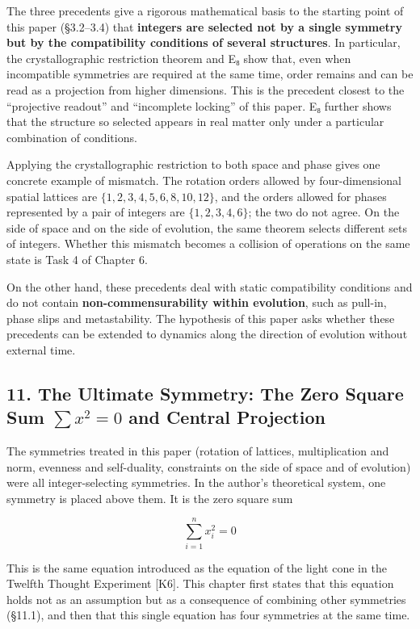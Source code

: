 \documentclass[
  a4paper,
]{article}
\begin{document}
The three precedents give a rigorous mathematical basis to the starting
point of this paper (§3.2--3.4) that \textbf{integers are selected not
by a single symmetry but by the compatibility conditions of several
structures}. In particular, the crystallographic restriction theorem and
E₈ show that, even when incompatible symmetries are required at the same
time, order remains and can be read as a projection from higher
dimensions. This is the precedent closest to the ``projective readout''
and ``incomplete locking'' of this paper. E₈ further shows that the
structure so selected appears in real matter only under a particular
combination of conditions.

Applying the crystallographic restriction to both space and phase gives
one concrete example of mismatch. The rotation orders allowed by
four-dimensional spatial lattices are \(\{1,2,3,4,5,6,8,10,12\}\), and
the orders allowed for phases represented by a pair of integers are
\(\{1,2,3,4,6\}\); the two do not agree. On the side of space and on the
side of evolution, the same theorem selects different sets of integers.
Whether this mismatch becomes a collision of operations on the same
state is Task 4 of Chapter 6.

On the other hand, these precedents deal with static compatibility
conditions and do not contain \textbf{non-commensurability within
evolution}, such as pull-in, phase slips and metastability. The
hypothesis of this paper asks whether these precedents can be extended
to dynamics along the direction of evolution without external time.

\subsection{\texorpdfstring{11. The Ultimate Symmetry: The Zero Square
Sum \(\sum x^2=0\) and Central
Projection}{11. The Ultimate Symmetry: The Zero Square Sum \textbackslash sum x\^{}2=0 and Central Projection}}\label{the-ultimate-symmetry-the-zero-square-sum-sum-x20-and-central-projection}

The symmetries treated in this paper (rotation of lattices,
multiplication and norm, evenness and self-duality, constraints on the
side of space and of evolution) were all integer-selecting symmetries.
In the author's theoretical system, one symmetry is placed above them.
It is the zero square sum

\[
\sum_{i=1}^{n}x_i^2=0
\tag{17}
\]

This is the same equation introduced as the equation of the light cone
in the Twelfth Thought Experiment {[}K6{]}. This chapter first states
that this equation holds not as an assumption but as a consequence of
combining other symmetries (§11.1), and then that this single equation
has four symmetries at the same time.
\end{document}
